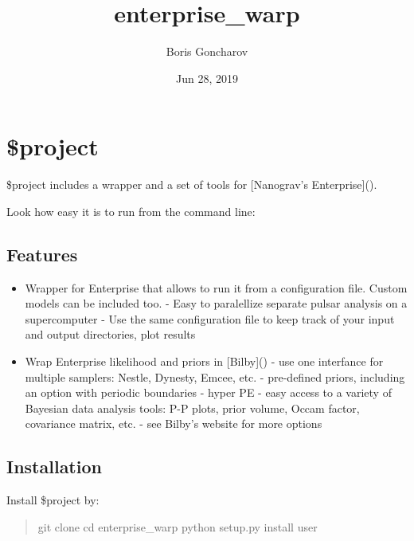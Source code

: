 \documentclass[letterpaper,10pt,english]{sphinxmanual}
\title{enterprise\_warp}
\date{Jun 28, 2019}
\author{Boris Goncharov}
\begin{document}
\pagestyle{empty}
\sphinxmaketitle
\pagestyle{plain}
\sphinxtableofcontents
\pagestyle{normal}
\label{\detokenize{index::doc}}



\chapter{\$project}
\label{\detokenize{index:project}}
\$project includes a wrapper and a set of tools for {[}Nanograv’s Enterprise{]}().

Look how easy it is to run from the command line: 


\section{Features}
\label{\detokenize{index:features}}\begin{itemize}
\item {} 
Wrapper for Enterprise that allows to run it from a configuration file. Custom models can be included too.
- Easy to paralellize separate pulsar analysis on a supercomputer
- Use the same configuration file to keep track of your input and output directories, plot results

\item {} 
Wrap Enterprise likelihood and priors in {[}Bilby{]}()
- use one interfance for multiple samplers: Nestle, Dynesty, Emcee, etc.
- pre-defined priors, including an option with periodic boundaries
- hyper PE
- easy access to a variety of Bayesian data analysis tools: P-P plots, prior volume, Occam factor, covariance matrix, etc.
- see Bilby’s website for more options

\end{itemize}


\section{Installation}
\label{\detokenize{index:installation}}
Install \$project by:
\begin{quote}

git clone 
cd enterprise\_warp
python setup.py install \textendash{}user
\end{quote}
\end{document}
